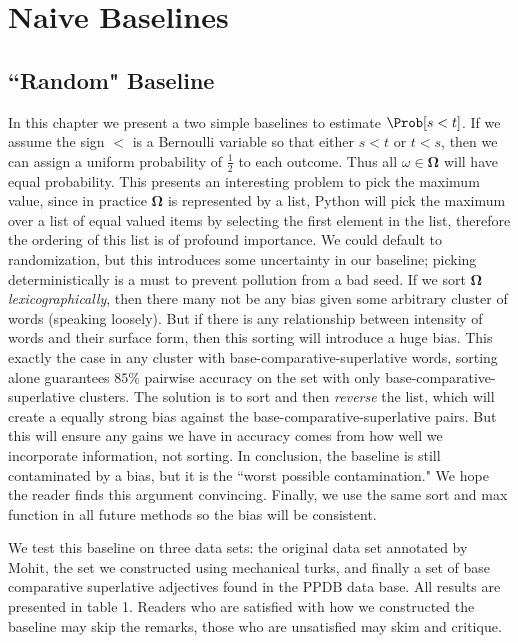 \section{Naive Baselines}

\subsection{``Random" Baseline}

In this chapter we present a two simple baselines to estimate $\Prob[s < t]$. If we assume the sign $<$ is a Bernoulli variable so that either $s < t$ or $t < s$, then we can assign a uniform probability of $\frac{1}{2}$ to each outcome. Thus all $\omega \in \pmb{\Omega}$ will have equal probability. This presents an interesting problem to pick the maximum value, since in practice $\pmb{\Omega}$ is represented by a list, Python will pick the maximum over a list of equal valued items by selecting the first element in the list, therefore the ordering of this list is of profound importance. We could default to randomization, but this introduces some uncertainty in our baseline; picking deterministically is a must to prevent pollution from a bad seed. If we sort $\pmb{\Omega}$ \textit{lexicographically}, then there many not be any bias given some arbitrary cluster of words (speaking loosely). But if there is any relationship between intensity of words and their surface form, then this sorting will introduce a huge bias. This exactly the case in any cluster with base-comparative-superlative words, sorting alone guarantees $85\%$ pairwise accuracy on the set with only base-comparative-superlative clusters. The solution is to sort and then \textit{reverse} the list, which will create a equally strong bias against the base-comparative-superlative pairs. But this will ensure any gains we have in accuracy comes from how well we incorporate information, not sorting. In conclusion, the baseline is still contaminated by a bias, but it is the ``worst possible contamination." We hope the reader finds this argument convincing. Finally, we use the same sort and max function in all future methods so the bias will be consistent. 

We test this baseline on three data sets: the original data set annotated by Mohit, the set we constructed using mechanical turks, and finally a set of base comparative superlative adjectives found in the PPDB data base. All results are presented in table 1. Readers who are satisfied with how we constructed the baseline may skip the remarks, those who are unsatisfied may skim and critique.

